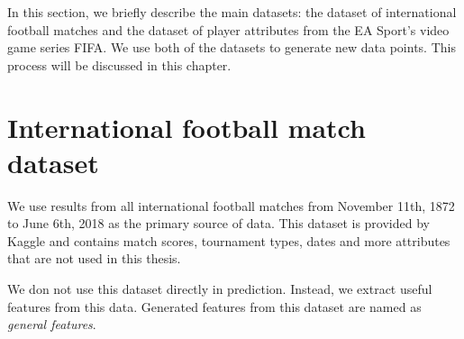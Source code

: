 In this section, we briefly describe the main datasets: the dataset of international football matches and the dataset of player attributes from the EA Sport's video game series FIFA. We use both of the datasets to generate new data points. This process will be discussed in this chapter.

\section{International football match dataset}
We use results from all international football matches from November 11th, 1872 to June 6th, 2018 as the primary source of data. This dataset is provided by Kaggle \cite{matchdb} and contains match scores, tournament types, dates and more attributes that are not used in this thesis.

We don not use this dataset directly in prediction. Instead, we extract useful features from this data. Generated features from this dataset are named as \textit{general features}.
\renewcommand{\labelitemi}{}
